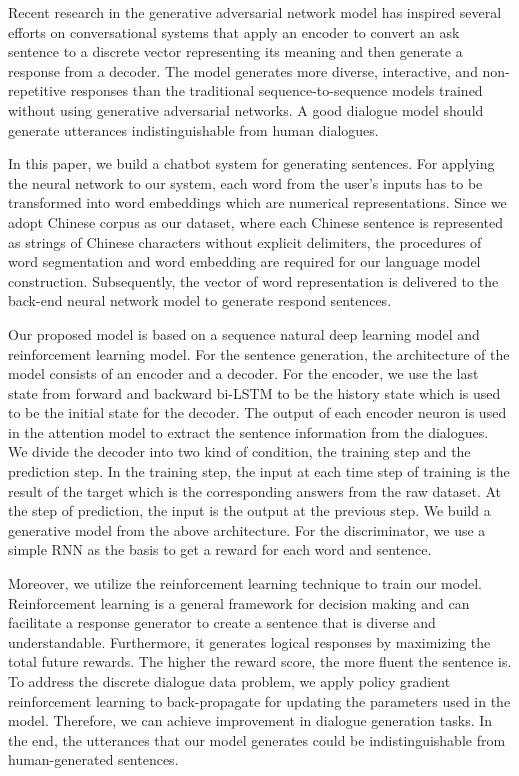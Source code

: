 Recent research in the generative adversarial \cite{Deep_Reinforcement_Learning_for_Dialogue_Generation} \cite{SeqGAN} network model has inspired several efforts on conversational systems that apply an encoder to convert an ask sentence to a discrete vector representing its meaning and then generate a response from a decoder. The model generates more diverse, interactive, and non-repetitive responses than the traditional sequence-to-sequence models trained without using generative adversarial networks. A good dialogue model should generate utterances indistinguishable from human dialogues.


    In this paper, we build a chatbot system for generating sentences. For applying the neural network to our system, each word from the user’s inputs has to be transformed into word embeddings which are numerical representations. Since we adopt Chinese corpus as our dataset, where each Chinese sentence is represented as strings of Chinese characters without explicit delimiters, the procedures of word segmentation and word embedding are required for our language model construction.  Subsequently, the vector of word representation is delivered to the back-end neural network model to generate respond sentences.
    
    
    Our proposed model is based on a sequence natural deep learning model and reinforcement learning model. For the sentence generation, the architecture of the model consists of an encoder and a decoder.  For the encoder, we use the last state from forward and backward bi-LSTM \cite{Bi-LSTM} to be the  history state which  is used to be the initial state  for the decoder. The output of each encoder neuron is used in the attention model to extract the sentence information from the dialogues. We divide the decoder into two kind of condition, the training step and the prediction step. In the training step, the input at each time step of training is the result of the target  which is the corresponding answers from the raw dataset. At the step of prediction, the input is the output at the previous step. We build a generative model from the above architecture. For the discriminator, we use a simple RNN as the basis to get a reward for each word and sentence.

Moreover, we utilize the reinforcement learning technique to train our model. Reinforcement learning is a general framework for decision making and can facilitate a response generator to create a sentence that is diverse and understandable. Furthermore, it generates logical responses by maximizing the total future rewards. The higher the reward score, the more fluent the sentence is. To address the discrete dialogue data problem, we apply policy gradient reinforcement learning to back-propagate for updating the parameters used in the model. Therefore, we can achieve improvement in dialogue generation tasks. In the end, the utterances that our model generates could be indistinguishable from human-generated sentences.

